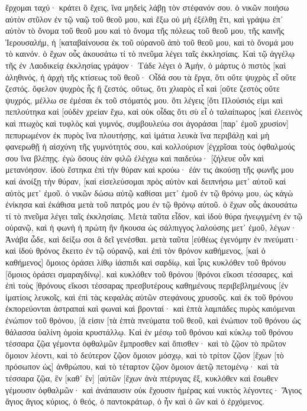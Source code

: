 ἔρχομαι ταχύ· κράτει ὃ ἔχεις, ἵνα μηδεὶς λάβῃ τὸν στέφανόν σου. 
ὁ νικῶν ποιήσω αὐτὸν στῦλον ἐν τῷ ναῷ τοῦ θεοῦ μου, καὶ ἔξω οὐ μὴ ἐξέλθῃ ἔτι, καὶ γράψω ἐπ᾽ αὐτὸν τὸ ὄνομα τοῦ θεοῦ μου καὶ τὸ ὄνομα τῆς πόλεως τοῦ θεοῦ μου, τῆς καινῆς Ἰερουσαλήμ, ἡ [καταβαίνουσα ἐκ τοῦ οὐρανοῦ ἀπὸ τοῦ θεοῦ μου, καὶ τὸ ὄνομά μου τὸ καινόν. 
ὁ ἔχων οὖς ἀκουσάτω τί τὸ πνεῦμα λέγει ταῖς ἐκκλησίαις. 
Καὶ τῷ ἀγγέλῳ τῆς ἐν Λαοδικείᾳ ἐκκλησίας γράψον· Τάδε λέγει ὁ Ἀμήν, ὁ μάρτυς ὁ πιστὸς [καὶ ἀληθινός, ἡ ἀρχὴ τῆς κτίσεως τοῦ θεοῦ· 
Οἶδά σου τὰ ἔργα, ὅτι οὔτε ψυχρὸς εἶ οὔτε ζεστός. ὄφελον ψυχρὸς ἦς ἢ ζεστός. 
οὕτως, ὅτι χλιαρὸς εἶ καὶ [οὔτε ζεστὸς οὔτε ψυχρός, μέλλω σε ἐμέσαι ἐκ τοῦ στόματός μου. 
ὅτι λέγεις [ὅτι Πλούσιός εἰμι καὶ πεπλούτηκα καὶ [οὐδὲν χρείαν ἔχω, καὶ οὐκ οἶδας ὅτι σὺ εἶ ὁ ταλαίπωρος [καὶ ἐλεεινὸς καὶ πτωχὸς καὶ τυφλὸς καὶ γυμνός, 
συμβουλεύω σοι ἀγοράσαι [παρ᾽ ἐμοῦ χρυσίον] πεπυρωμένον ἐκ πυρὸς ἵνα πλουτήσῃς, καὶ ἱμάτια λευκὰ ἵνα περιβάλῃ καὶ μὴ φανερωθῇ ἡ αἰσχύνη τῆς γυμνότητός σου, καὶ κολλούριον [ἐγχρῖσαι τοὺς ὀφθαλμούς σου ἵνα βλέπῃς. 
ἐγὼ ὅσους ἐὰν φιλῶ ἐλέγχω καὶ παιδεύω· [ζήλευε οὖν καὶ μετανόησον. 
ἰδοὺ ἕστηκα ἐπὶ τὴν θύραν καὶ κρούω· ἐάν τις ἀκούσῃ τῆς φωνῆς μου καὶ ἀνοίξῃ τὴν θύραν, [καὶ εἰσελεύσομαι πρὸς αὐτὸν καὶ δειπνήσω μετ᾽ αὐτοῦ καὶ αὐτὸς μετ᾽ ἐμοῦ. 
ὁ νικῶν δώσω αὐτῷ καθίσαι μετ᾽ ἐμοῦ ἐν τῷ θρόνῳ μου, ὡς κἀγὼ ἐνίκησα καὶ ἐκάθισα μετὰ τοῦ πατρός μου ἐν τῷ θρόνῳ αὐτοῦ. 
ὁ ἔχων οὖς ἀκουσάτω τί τὸ πνεῦμα λέγει ταῖς ἐκκλησίαις. 
Μετὰ ταῦτα εἶδον, καὶ ἰδοὺ θύρα ἠνεῳγμένη ἐν τῷ οὐρανῷ, καὶ ἡ φωνὴ ἡ πρώτη ἣν ἤκουσα ὡς σάλπιγγος λαλούσης μετ᾽ ἐμοῦ, λέγων· Ἀνάβα ὧδε, καὶ δείξω σοι ἃ δεῖ γενέσθαι. μετὰ ταῦτα 
[εὐθέως ἐγενόμην ἐν πνεύματι· καὶ ἰδοὺ θρόνος ἔκειτο ἐν τῷ οὐρανῷ, καὶ ἐπὶ τὸν θρόνον καθήμενος, 
[καὶ ὁ καθήμενος] ὅμοιος ὁράσει λίθῳ ἰάσπιδι καὶ σαρδίῳ, καὶ ἶρις κυκλόθεν τοῦ θρόνου [ὅμοιος ὁράσει σμαραγδίνῳ]. 
καὶ κυκλόθεν τοῦ θρόνου [θρόνοι εἴκοσι τέσσαρες, καὶ ἐπὶ τοὺς [θρόνους εἴκοσι τέσσαρας πρεσβυτέρους καθημένους περιβεβλημένους [ἐν ἱματίοις λευκοῖς, καὶ ἐπὶ τὰς κεφαλὰς αὐτῶν στεφάνους χρυσοῦς. 
καὶ ἐκ τοῦ θρόνου ἐκπορεύονται ἀστραπαὶ καὶ φωναὶ καὶ βρονταί· καὶ ἑπτὰ λαμπάδες πυρὸς καιόμεναι ἐνώπιον τοῦ θρόνου, [ἅ εἰσιν [τὰ ἑπτὰ πνεύματα τοῦ θεοῦ, 
καὶ ἐνώπιον τοῦ θρόνου ὡς θάλασσα ὑαλίνη ὁμοία κρυστάλλῳ. Καὶ ἐν μέσῳ τοῦ θρόνου καὶ κύκλῳ τοῦ θρόνου τέσσαρα ζῷα γέμοντα ὀφθαλμῶν ἔμπροσθεν καὶ ὄπισθεν· 
καὶ τὸ ζῷον τὸ πρῶτον ὅμοιον λέοντι, καὶ τὸ δεύτερον ζῷον ὅμοιον μόσχῳ, καὶ τὸ τρίτον ζῷον [ἔχων [τὸ πρόσωπον ὡς] ἀνθρώπου, καὶ τὸ τέταρτον ζῷον ὅμοιον ἀετῷ πετομένῳ· 
καὶ τὰ τέσσαρα ζῷα, ἓν [καθ᾽ ἓν] [αὐτῶν [ἔχων ἀνὰ πτέρυγας ἕξ, κυκλόθεν καὶ ἔσωθεν γέμουσιν ὀφθαλμῶν· καὶ ἀνάπαυσιν οὐκ ἔχουσιν ἡμέρας καὶ νυκτὸς λέγοντες· Ἅγιος ἅγιος ἅγιος κύριος, ὁ θεός, ὁ παντοκράτωρ, ὁ ἦν καὶ ὁ ὢν καὶ ὁ ἐρχόμενος. 
